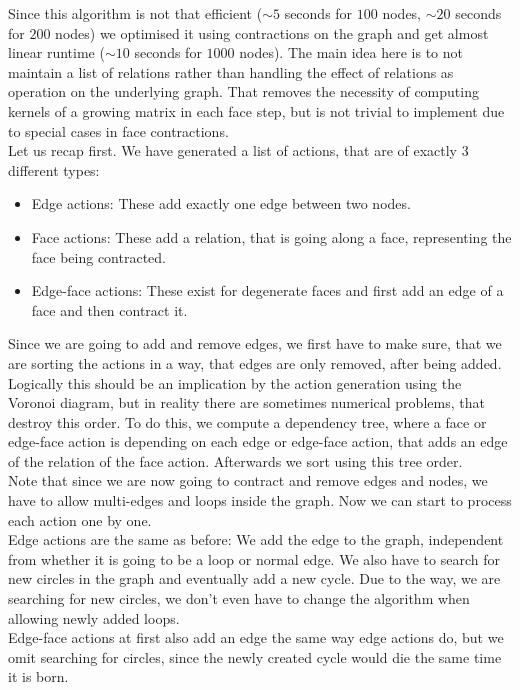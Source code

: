 \documentclass[11pt, a4paper,draft]{report}
\begin{document}
    Since this algorithm is not that efficient ($\sim5$ seconds for $100$ nodes, $\sim20$ seconds for $200$ nodes) we optimised it using contractions on the graph and get almost linear runtime ($\sim10$ seconds for $1000$ nodes).
    The main idea here is to not maintain a list of relations rather than handling the effect of relations as operation on the underlying graph.
    That removes the necessity of computing kernels of a growing matrix in each face step, but is not trivial to implement due to special cases in face contractions.\\
    Let us recap first.
    We have generated a list of actions, that are of exactly 3 different types:
    \begin{itemize}
        \item Edge actions: These add exactly one edge between two nodes.
        \item Face actions: These add a relation, that is going along a face, representing the face being contracted.
        \item Edge-face actions: These exist for degenerate faces and first add an edge of a face and then contract it.
    \end{itemize}
    Since we are going to add and remove edges, we first have to make sure, that we are sorting the actions in a way, that edges are only removed, after being added.
    Logically this should be an implication by the action generation using the Voronoi diagram, but in reality there are sometimes numerical problems, that destroy this order.
    To do this, we compute a dependency tree, where a face or edge-face action is depending on each edge or edge-face action, that adds an edge of the relation of the face action.
    Afterwards we sort using this tree order.\\
    Note that since we are now going to contract and remove edges and nodes, we have to allow multi-edges and loops inside the graph.
    Now we can start to process each action one by one.\\
    Edge actions are the same as before: We add the edge to the graph, independent from whether it is going to be a loop or normal edge.
    We also have to search for new circles in the graph and eventually add a new cycle.
    Due to the way, we are searching for new circles, we don't even have to change the algorithm when allowing newly added loops.\\
    Edge-face actions at first also add an edge the same way edge actions do, but we omit searching for circles, since the newly created cycle would die the same time it is born.
\end{document}
